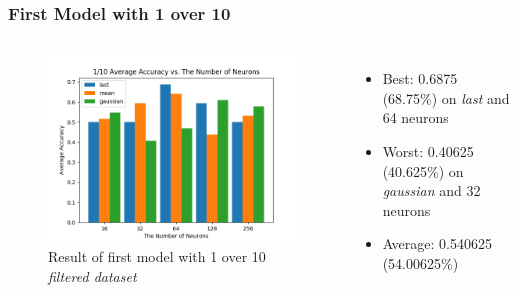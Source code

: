 \documentclass{beamer}
\begin{document}
\begin{frame}
\frametitle{First Model with 1 over 10}
\begin{columns}
\begin{figure}[t!]
    \centering
    \includegraphics[width=\textwidth]{../paper/pictures/result_pictures/filtered_1_10_result.png}
    \caption{Result of first model with 1 over 10 {\em filtered dataset}}
    \label{fig:filter_1_10}
\end{figure}

\begin{itemize}
\item Best: 0.6875 (68.75\%) on {\em last} and 64 neurons
\item Worst: 0.40625 (40.625\%) on {\em gaussian} and 32 neurons
\item Average: 0.540625 (54.00625\%)
\end{itemize}
\end{columns}
\end{frame}
\end{document}
